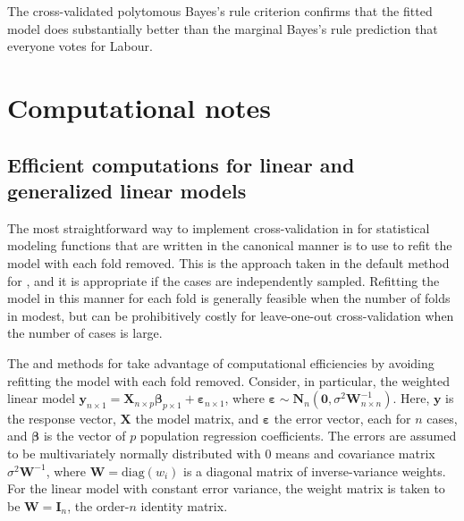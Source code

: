 \documentclass[
]{jss}
\begin{document}
The cross-validated polytomous Bayes's rule criterion confirms that the
fitted model does substantially better than the marginal Bayes's rule
prediction that everyone votes for Labour.

\hypertarget{computational-notes}{%
\section{Computational notes}\label{computational-notes}}

\hypertarget{efficient-computations-for-linear-and-generalized-linear-models}{%
\subsection{Efficient computations for linear and generalized linear
models}\label{efficient-computations-for-linear-and-generalized-linear-models}}

The most straightforward way to implement cross-validation in
 for statistical modeling functions that are written in the
canonical manner is to use  to refit the model with each
fold removed. This is the approach taken in the default method for
, and it is appropriate if the cases are independently
sampled. Refitting the model in this manner for each fold is generally
feasible when the number of folds in modest, but can be prohibitively
costly for leave-one-out cross-validation when the number of cases is
large.

The  and  methods for  take advantage
of computational efficiencies by avoiding refitting the model with each
fold removed. Consider, in particular, the weighted linear model
\(\mathbf{y}_{n \times 1} = \mathbf{X}_{n \times p}\boldsymbol{\beta}_{p \times 1} + \boldsymbol{\varepsilon}_{n \times 1}\),
where
\(\boldsymbol{\varepsilon} \sim \mathbf{N}_n \left(\mathbf{0}, \sigma^2 \mathbf{W}^{-1}_{n \times n}\right)\).
Here, \(\mathbf{y}\) is the response vector, \(\mathbf{X}\) the model
matrix, and \(\boldsymbol{\varepsilon}\) the error vector, each for
\(n\) cases, and \(\boldsymbol{\beta}\) is the vector of \(p\)
population regression coefficients. The errors are assumed to be
multivariately normally distributed with 0 means and covariance matrix
\(\sigma^2 \mathbf{W}^{-1}\), where \(\mathbf{W} = \mathrm{diag}(w_i)\)
is a diagonal matrix of inverse-variance weights. For the linear model
with constant error variance, the weight matrix is taken to be
\(\mathbf{W} = \mathbf{I}_n\), the order-\(n\) identity matrix.
\end{document}
